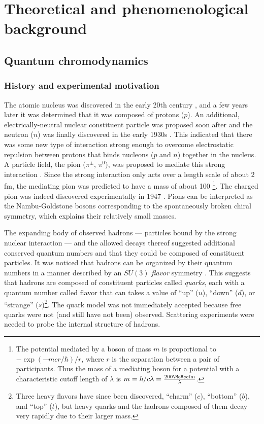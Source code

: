 \chapter{Theoretical and phenomenological background}
\label{ch:background}
\graphicspath{{Chapter-Background/figures/}}

\section{Quantum chromodynamics}
\subsection{History and experimental motivation}

The atomic nucleus was discovered in the early 20th century \cite{Rutherford:1911zz}, and a few years later it was determined that it was composed of protons ($p$).
An additional, electrically-neutral nuclear constituent particle was proposed soon after and the neutron ($n$) was finally discovered in the early 1930s \cite{Chadwick:1932ma}.
This indicated that there was some new type of interaction strong enough to overcome electrostatic repulsion between protons that binds nucleons ($p$ and $n$) together in the nucleus.
A particle field, the pion ($\pi^\pm$, $\pi^0$), was proposed to mediate this strong interaction \cite{Yukawa:1935xg}.
Since the strong interaction only acts over a length scale of about 2 fm, the mediating pion was predicted to have a mass of about 100 \MeV\footnote{The potential mediated by a boson of mass $m$ is proportional to \( - \exp(-mcr/\hbar)/r\), where $r$ is the separation between a pair of participants. Thus the mass of a mediating boson for a potential with a characteristic cutoff length of $\lambda$ is $m = \hbar/c\lambda = \frac{200 \MeVcc \textrm{fm}}{\lambda}$.}.
The charged pion was indeed discovered experimentally in 1947 \cite{Lattes:1947mw}.
Pions can be interpreted as the Nambu-Goldstone bosons corresponding to the spontaneously broken chiral symmetry, which explains their relatively small masses.

The expanding body of observed hadrons --- particles bound by the strong nuclear interaction --- and the allowed decays thereof suggested additional conserved quantum numbers and that they could be composed of constituent particles.
It was noticed that hadrons can be organized by their quantum numbers in a manner described by an $SU(3)$ \emph{flavor} symmetry \cite{GellMann:1962xb}.
This suggests that hadrons are composed of constituent particles called \emph{quarks}, each with a quantum number called flavor that can takes a value of ``up'' ($u$), ``down'' ($d$), or ``strange'' ($s$)\footnote{Three heavy flavors have since been discovered, ``charm'' ($c$), ``bottom'' ($b$), and ``top'' ($t$), but heavy quarks and the hadrons composed of them decay very rapidly due to their larger mass.}.
The quark model was not immediately accepted because free quarks were not (and still have not been) observed.
Scattering experiments were needed to probe the internal structure of hadrons.

